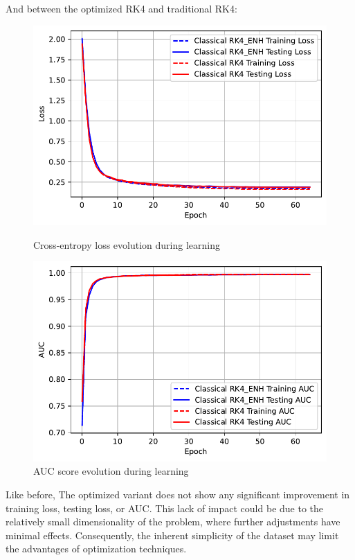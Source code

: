 \documentclass[12pt,a4paper]{report}
\begin{document}
\clearpage

And between the optimized RK4 and traditional RK4:

\begin{figure}[th]
  \centering
  \includegraphics[scale=0.88]{./pics/new_pdf_graphs/classical/3_rk_1_dec/classical_transfomer_loss_mnist_rk4_rk4_enh.pdf}
  \caption[Cross-entropy loss evolution during learning]{Cross-entropy loss evolution during learning}
  \label{fig:p21_}
  \vspace*{\floatsep}
  \centering
  \includegraphics[scale=0.88]{./pics/new_pdf_graphs/classical/3_rk_1_dec/classical_transfomer_auc_mnist_rk4_rk4_enh.pdf}
  \caption[AUC score evolution during learning]{AUC score evolution during learning}
  \label{fig:p21}
\end{figure}


Like before, The optimized variant does not show any significant improvement in training loss, testing loss, or AUC. This lack of impact could be due to the relatively small dimensionality of the problem, where further adjustments have minimal effects. Consequently, the inherent simplicity of the dataset may limit the advantages of optimization techniques.
\clearpage
\end{document}

